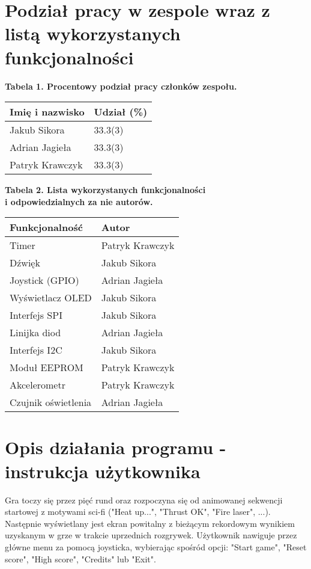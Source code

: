 \documentclass[letterpaper,11pt]{report}
\begin{document}
\chapter{Podział pracy w zespole wraz z listą wykorzystanych funkcjonalności}
\begin{table}[h]
    \centering
    \textbf{Tabela 1. Procentowy podział pracy członków zespołu.\\}
    \vspace{1em}
    \begin{tabular}{|l|l|}
        \hline
        Imię i nazwisko     & Udział (\%) \\
        \hline
        Jakub Sikora        & 33.3(3)      \\
        Adrian Jagieła      & 33.3(3)      \\
        Patryk Krawczyk     & 33.3(3)      \\
        \hline
    \end{tabular}

    \vspace{2em}
    \textbf{Tabela 2. Lista wykorzystanych funkcjonalności \\ i odpowiedzialnych za nie autorów. \\}
    \vspace{1em}
    \begin{tabular}{|l|l|}
        \hline
        Funkcjonalność      & Autor        \\
        \hline
        Timer               & Patryk Krawczyk \\
        Dźwięk              & Jakub Sikora \\
        Joystick (GPIO)     & Adrian Jagieła \\
        Wyświetlacz OLED    & Jakub Sikora \\
        Interfejs SPI       & Jakub Sikora \\
        Linijka diod        & Adrian Jagieła \\
        Interfejs I2C       & Jakub Sikora \\
        Moduł EEPROM        & Patryk Krawczyk \\
        Akcelerometr        & Patryk Krawczyk \\
        Czujnik oświetlenia & Adrian Jagieła \\
        \hline
    \end{tabular}
\end{table}

\chapter{Opis działania programu - instrukcja użytkownika}
Gra toczy się przez pięć rund oraz rozpoczyna się od animowanej sekwencji startowej z motywami sci-fi ("Heat up...", "Thrust OK", "Fire laser", ...). Następnie wyświetlany jest ekran powitalny z bieżącym rekordowym wynikiem uzyskanym w grze w trakcie uprzednich rozgrywek. Użytkownik nawiguje przez główne menu za pomocą joysticka, wybierając spośród opcji: "Start game", "Reset score", "High score", "Credits" lub "Exit".
\end{document}
